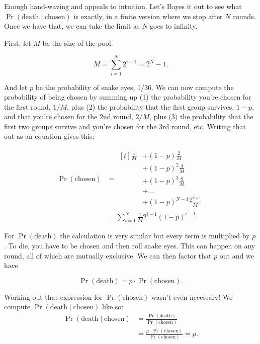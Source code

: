 \documentclass[article,twocolumn]{memoir}
\begin{document}
Enough hand-waving and appeals to intuition.
Let's Bayes it out to see what 
$\Pr(\text{death} \mid \text{chosen})$
is exactly, in a finite version where we stop after $N$ rounds.
Once we have that, we can take the limit as $N$ goes to infinity.

First, let $M$ be the size of the pool:

$$M = \sum_{i=1}^{N} 2^{i-1} = 2^N-1.$$

And let $p$ be the probability of snake eyes, 1/36.
We can now compute the probability of being chosen by summing up 
(1) the probability you're chosen for the first round, $1/M$, plus 
(2) the probability that the first group survives, $1-p$, and that you're chosen for the 2nd round, $2/M$, plus 
(3) the probability that the first two groups survive and you're chosen for the 3rd round, etc.
Writing that out as an equation gives this:

\begin{align*}
\Pr(\text{chosen}) & = 
\begin{aligned}[t]
\tfrac{1}{M} & + (1-p)      \tfrac{2}{M} \\
             & + (1-p)^2    \tfrac{4}{M} \\
             & + (1-p)^3    \tfrac{8}{M} \\
             & + \ldots                  \\
             & + (1-p)^{N-1}\frac{2^{N-1}}{M}
\end{aligned} \\
& = \sum_{i=1}^{N} \tfrac{1}{M} 2^{i-1}(1-p)^{i-1}.
\end{align*}

For $\Pr(\text{death})$ the calculation is very similar but every term is multiplied by $p$.
To die, you have to be chosen and then roll snake eyes.
This can happen on any round, all of which are mutually exclusive.
We can then factor that $p$ out and we have

$$
\Pr(\text{death}) = p\cdot\Pr(\text{chosen}).
$$

Working out that expression for $\Pr(\text{chosen})$ wasn't even necessary!
We compute $\Pr(\text{death} \mid \text{chosen})$ like so:
\begin{equation*}
\begin{split}
\Pr(\text{death} \mid \text{chosen}) & = 
\frac{\Pr(\text{death})}{\Pr(\text{chosen})} \\
& = \frac{p\cdot\Pr(\text{chosen})}{\Pr(\text{chosen})} = 
p.
\end{split}
\end{equation*}
\end{document}

